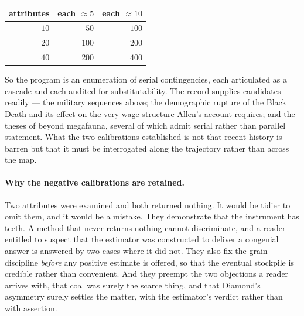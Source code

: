\begin{remark}
\begin{center}\small
\begin{tabular}{@{}rrr@{}}
\toprule
attributes & each $\approx5$ & each $\approx10$\\
\midrule
$10$ & $50$ & $100$\\
$20$ & $100$ & $200$\\
$40$ & $200$ & $400$\\
\bottomrule
\end{tabular}
\end{center}

\noindent So the program is an enumeration of serial contingencies,
each articulated as a cascade and each audited for substitutability. The
record supplies candidates readily --- the military sequences above; the
demographic rupture of the Black Death and its effect on the very wage
structure Allen's account requires; and the theses of \cite{Diamond97}
beyond megafauna, several of which admit serial rather than parallel
statement. What the two calibrations established is not that recent
history is barren but that it must be interrogated along the trajectory
rather than across the map.

\paragraph{Why the negative calibrations are retained.}\label{gc:rem:whyretain}
Two attributes were examined and both returned nothing. It would be
tidier to omit them, and it would be a mistake. They demonstrate that the instrument has teeth. A method that never
returns nothing cannot discriminate, and a reader entitled to suspect
that the estimator was constructed to deliver a congenial answer is
answered by two cases where it did not. They also fix the grain
discipline \emph{before} any positive estimate is offered, so that the
eventual stockpile is credible rather than convenient. And they preempt
the two objections a reader arrives with, that coal was surely the
scarce thing, and that Diamond's asymmetry surely settles the matter, with the estimator's verdict rather than with assertion.


\end{remark}
